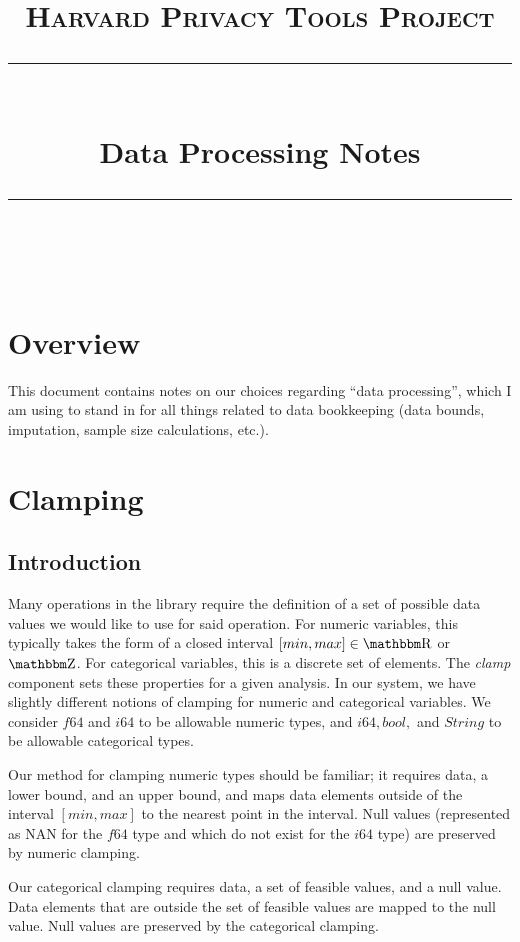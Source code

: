 \documentclass[11pt]{scrartcl} %
\title{
	\normalfont\normalsize
	\textsc{Harvard Privacy Tools Project}\\ %
	\vspace{25pt} %
	\rule{\linewidth}{0.5pt}\\ %
	\vspace{20pt} %
	{\huge Data Processing Notes}\\ %
	\vspace{12pt} %
	\rule{\linewidth}{2pt}\\ %
	\vspace{12pt} %
}
\author{} %
\date{} %
\begin{document}
\maketitle

\tableofcontents

\section{Overview}
This document contains notes on our choices regarding ``data processing'', which I am using to stand in
for all things related to data bookkeeping (data bounds, imputation, sample size calculations, etc.).

\section{Clamping}

\subsection{Introduction}
Many operations in the library require the definition of a set of possible data values
we would like to use for said operation. For numeric variables, this typically
takes the form of a closed interval $[min, max] \in \R$ or $\Z$. For categorical
variables, this is a discrete set of elements. The \emph{clamp} component sets these 
properties for a given analysis.
In our system, we have slightly different notions of clamping for numeric and categorical variables.
We consider $f64$ and $i64$ to be allowable numeric types, and $i64, bool,$ and $String$ to be
allowable categorical types. \newline

Our method for clamping numeric types should be familiar; it requires data, a lower bound, and an upper bound,
and maps data elements outside of the interval $[min, max]$ to the nearest point in the interval.
Null values (represented as NAN for the $f64$ type and which do not exist for the $i64$ type)
are preserved by numeric clamping. \newline

Our categorical clamping requires data, a set of feasible values, and a null value.
Data elements that are outside the set of feasible values are mapped to the null value.
Null values are preserved by the categorical clamping. \newline 
\end{document}
